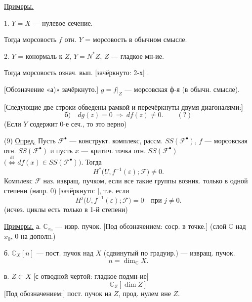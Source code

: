 \underline{Примеры.}

1. $Y=X$ — нулевое сечение.

Тогда морсовость $f$ отн. $Y$ = морсовость в обычном смысле.

2. $Y$ = конормаль к $Z$, $Y=N^{*}Z$, $Z$ — гладкое мн-ие.

Тогда морсовость означ. вып. [зачёркнуто: 2-х]
.

[Обозначение «а)» зачёркнуто.]
$g=f|_Z$ — морсовская ф-я (в обычн. смысле).

[Следующие две строки обведены рамкой и перечёркнуты двумя диагоналями:]
\begin{equation*}
\text{б)}\quad dg(z)=0\ \Rightarrow\ df(z)\ne0.\qquad (?)
\end{equation*}
(Если $Y$ содержит 0-е сеч., то это верно)



(9) \underline{Опред.}
Пусть $\mathcal{F}^{\bullet}$ — конструкт. комплекс, рассм.
$SS(\mathcal{F}^{\bullet})$, $f$ — морсовская отн.
$SS(\mathcal{F}^{\bullet})$ и пусть $x$ —
критич. точка отн. $SS(\mathcal{F}^{\bullet})$
$\bigl(\overset{\mathrm{df}}{\Longleftrightarrow}
df(x)\in SS(\mathcal{F}^{\bullet})\bigr)$.
Тогда
\begin{equation*}
H^{*}\bigl(U,f^{-1}(\varepsilon);\mathcal{F}\bigr)\ne0.
\end{equation*}
Комплекс $\mathcal{F}$ наз. извращ. пучком,
если все такие группы возник. только в одной степени
(напр. 0) [зачёркнуто: ], т.е. если
\begin{equation*}
H^{j}\bigl(U,f^{-1}(\varepsilon);\mathcal{F}\bigr)=0
\quad\text{при }j\ne0. \tag{10}
\end{equation*}
(исчез. циклы есть только в 1-й степени)

\underline{Примеры.}
а. $\mathbb{C}_{x_0}$ — извр. пучок.
[Под обозначением: соср. в точке.]
(слой $\mathbb{C}$ над $x_0$, $0$ на дополн.)

б. $\mathbb{C}_X[n]$ — пост. пучок над $X$
(сдвинутый по градуир.) — извращ. пучок.
\begin{equation*}
n=\dim_{\mathbb{C}}X.
\end{equation*}

в. $Z\subset X$ [с отводной чертой: гладкое подмн-ие]
\begin{equation*}
\mathbb{C}_Z[\dim Z]
\end{equation*}
[Под обозначением:]
пост. пучок на $Z$, прод. нулем вне $Z$.

